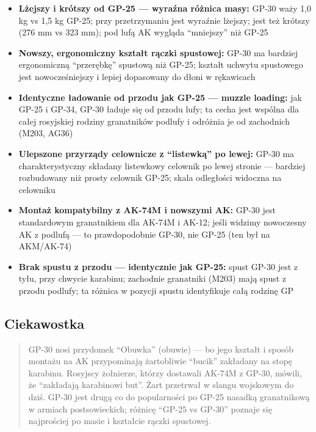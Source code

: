 \documentclass[12pt,oneside]{book}
\providecommand{\tightlist}{%
  \setlength{\itemsep}{0pt}\setlength{\parskip}{0pt}}
\begin{document}
\begin{itemize}
\tightlist
\item
  \textbf{Lżejszy i krótszy od GP-25 --- wyraźna różnica masy:} GP-30
  waży 1,0 kg vs 1,5 kg GP-25; przy przetrzymaniu jest wyraźnie lżejszy;
  jest też krótszy (276 mm vs 323 mm); pod lufą AK wygląda ``mniejszy''
  niż GP-25
\item
  \textbf{Nowszy, ergonomiczny kształt rączki spustowej:} GP-30 ma
  bardziej ergonomiczną ``przerębkę'' spustową niż GP-25; kształt
  uchwytu spustowego jest nowocześniejszy i lepiej dopasowany do dłoni w
  rękawicach
\item
  \textbf{Identyczne ładowanie od przodu jak GP-25 --- muzzle loading:}
  jak GP-25 i GP-34, GP-30 ładuje się od przodu lufy; ta cecha jest
  wspólna dla całej rosyjskiej rodziny granatników podlufy i odróżnia je
  od zachodnich (M203, AG36)
\item
  \textbf{Ulepszone przyrządy celownicze z ``listewką'' po lewej:} GP-30
  ma charakterystyczny składany listewkowy celownik po lewej stronie ---
  bardziej rozbudowany niż prosty celownik GP-25; skala odległości
  widoczna na celowniku
\item
  \textbf{Montaż kompatybilny z AK-74M i nowszymi AK:} GP-30 jest
  standardowym granatnikiem dla AK-74M i AK-12; jeśli widzimy nowoczesny
  AK z podlufą --- to prawdopodobnie GP-30, nie GP-25 (ten był na
  AKM/AK-74)
\item
  \textbf{Brak spustu z przodu --- identycznie jak GP-25:} spust GP-30
  jest z tyłu, przy chwycie karabinu; zachodnie granatniki (M203) mają
  spust z przodu podlufy; ta różnica w pozycji spustu identyfikuje całą
  rodzinę GP
\end{itemize}

\subsection{Ciekawostka}\label{ciekawostka-95}

\begin{quote}
GP-30 nosi przydomek ``Obuwka'' (obuwie) --- bo jego kształt i sposób
montażu na AK przypominają żartobliwie ``bucik'' zakładany na stopę
karabinu. Rosyjscy żołnierze, którzy dostawali AK-74M z GP-30, mówili,
że ``zakładają karabinowi but''. Żart przetrwał w slangu wojskowym do
dziś. GP-30 jest drugą co do popularności po GP-25 nasadką granatnikową
w armiach postsowieckich; różnicę ``GP-25 vs GP-30'' poznaje się
najprościej po masie i kształcie rączki spustowej.
\end{quote}
\end{document}
